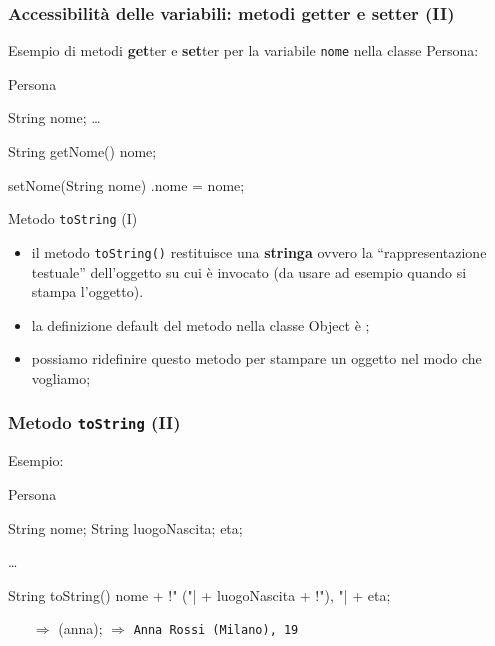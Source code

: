 \begin{frame}[fragile]\frametitle{Accessibilità delle variabili: metodi getter e setter (II)}

  Esempio di metodi \textbf{get}ter e \textbf{set}ter per la variabile \texttt{nome} nella classe
  Persona:
  
  \begin{JavaCodePlain}[commandchars=\\!|]
  \Jpublic \Jclass Persona {

    \Jprivate String nome;
    \dots
    
    \Jpublic String getNome() {
      \Jreturn nome;
    }

    \Jpublic \Jvoid setNome(String nome) {
      \Jthis.nome = nome;
    }

  }
  \end{JavaCodePlain}

\end{frame}

\begin{frame}{Metodo \texttt{toString} (I)}

  \begin{itemize}
    \item il metodo \texttt{toString()} restituisce una \textbf{stringa} ovvero la ``rappresentazione testuale''
	  dell'oggetto su cui è invocato (da usare ad esempio quando si stampa l'oggetto). 
    \item la definizione default del metodo nella classe Object è ;
    \item possiamo ridefinire questo metodo per stampare un oggetto nel modo che vogliamo;
  \end{itemize}

\end{frame}

\begin{frame}[fragile]\frametitle{Metodo \texttt{toString} (II)}

  Esempio:
  \begin{JavaCodePlain}[commandchars=\\!|]
  \Jpublic \Jclass Persona {
  
    \Jprivate String nome;
    \Jprivate String luogoNascita;
    \Jprivate \Jint eta;

    \dots

    \Jpublic String toString() {
      \Jreturn nome + \String!" ("| + luogoNascita + \String!"), "| + eta;
    }
  }
  \end{JavaCodePlain}

  \begin{itemize}
   \item[$\Rightarrow$] \JprintLN(anna); $\Longrightarrow$ \texttt{Anna Rossi (Milano), 19}
  \end{itemize}

\end{frame}

